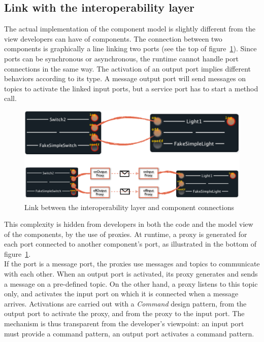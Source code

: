 \subsection{Link with the interoperability layer}
\label{subsec:compModLinkWithInterop}
The actual implementation of the component model is slightly different from the view developers can have of components. The connection between two components is graphically a line linking two ports (see the top of figure~\ref{fig:linkWithInteropLayer}). Since ports can be synchronous or asynchronous, the runtime cannot handle port connections in the same way. The activation of an output port implies different behaviors according to its type. A message output port will send messages on topics to activate the linked input ports, but a service port has to start a method call.\\

\begin{figure}[h!]
\includegraphics[width=\textwidth]{part2/pics/InteropModelLink}
\caption{Link between the interoperability layer and component connections}
\label{fig:linkWithInteropLayer}
\end{figure}

This complexity is hidden from developers in both the code and the model view of the components, by the use of proxies. At runtime, a proxy is generated for each port connected to another component's port, as illustrated in the bottom of figure~\ref{fig:linkWithInteropLayer}.\\
If the port is a message port, the proxies use messages and topics to communicate with each other. When an output port is activated, its proxy generates and sends a message on a pre-defined topic. On the other hand, a proxy listens to this topic only, and activates the input port on which it is connected when a message arrives. Activations are carried out with a {\it Command} design pattern, from the output port to activate the proxy, and from the proxy to the input port. The mechanism is thus transparent from the developer's viewpoint: an input port must provide a command pattern, an output port activates a command pattern.\\

